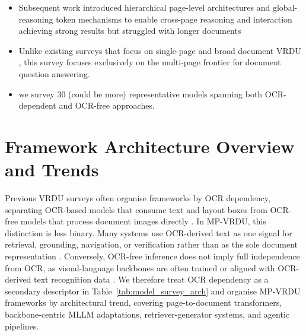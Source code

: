 \documentclass[11pt]{article}
\begin{document}
\begin{itemize}
    \item Subsequent work introduced hierarchical page-level architectures \cite{tito2023hierarchical} and global-reasoning token mechanisms \cite{blau2024gram} to enable cross-page reasoning and interaction achieving strong results but struggled with longer documents
    \item Unlike existing surveys that focus on single-page and broad document VRDU \cite{ding2025survey}, this survey focuses exclusively on the multi-page frontier for document question answering.
    \item we survey 30 (could be more) representative models spanning both OCR-dependent and OCR-free approaches.
\end{itemize}



\section{Framework Architecture Overview and Trends}
Previous VRDU surveys often organise frameworks by OCR dependency, separating OCR-based models that consume text and layout boxes from OCR-free models that process document images directly \cite{huang2022layoutlmv3, ding2025survey}. In MP-VRDU, this distinction is less binary. Many systems use OCR-derived text as one signal for retrieval, grounding, navigation, or verification rather than as the sole document representation \cite{sun2025docagent, wang2025vidorag}. Conversely, OCR-free inference does not imply full independence from OCR, as visual-language backbones are often trained or aligned with OCR-derived text recognition data \cite{tanaka2025vdocrag, hu2024mplug}. We therefore treat OCR dependency as a secondary descriptor in Table~\ref{tab:model_survey_arch} and organise MP-VRDU frameworks by architectural trend, covering page-to-document transformers, backbone-centric MLLM adaptations, retriever-generator systems, and agentic pipelines.

\end{document}
